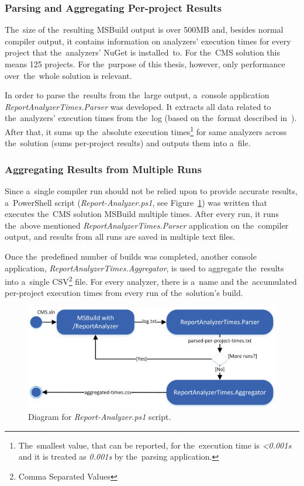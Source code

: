\documentclass[
  digital, %
  table,   %
  lof,     %
  lot,     %
  oneside,
]{fithesis3}
\begin{document}
\subsubsection{\textbf{Parsing and Aggregating Per-project Results}}
The~size of the~resulting MSBuild output is over 500MB and, besides normal compiler output, it contains information on analyzers' execution times for every project that the~analyzers' NuGet is installed~to. For the~CMS solution this means 125 projects. For the~purpose of this thesis, however, only performance over~the~whole solution is relevant. 

In order to parse the~results from the~large output, a~console application \textit{ReportAnalyzerTimes.Parser} was developed. It extracts all data related to the~analyzers' execution times from the~log (based on the~format described in~\cite{report-analyzer}). After that, it sums up the~absolute execution times\footnote{The~smallest value, that can be reported, for the~execution time is \textit{<0.001s} and it is treated as \textit{0.001s} by the~parsing application.} for same analyzers across the~solution (sums per-project results) and outputs them into a~file.

\subsubsection{\textbf{Aggregating Results from Multiple Runs}}
Since a~single compiler run should not be relied upon to provide accurate results, a~PowerShell script (\textit{Report-Analyzer.ps1}, see Figure~\ref{fig:uml-report-analyzer-dfd}) was written that executes the~CMS solution MSBuild multiple times. After every run, it runs the~above mentioned \textit{ReportAnalyzerTimes.Parser} application on the~compiler output, and results from all runs are saved in multiple text files. 

Once the~predefined number of builds was completed, another console application, \textit{ReportAnalyzerTimes.Aggregator}, is used to aggregate the~results into a~single CSV\footnote{Comma Separated Values} file. For every analyzer, there is a~name and the~accumulated per-project execution times from every run of the~solution's build.

\begin{figure}[h!]
		\centering
			\includegraphics[scale=0.98]{img/uml/report-analyzer-flow}
		\caption{Diagram for \textit{Report-Analyzer.ps1} script.}
		\label{fig:uml-report-analyzer-dfd}
\end{figure}
\end{document}
